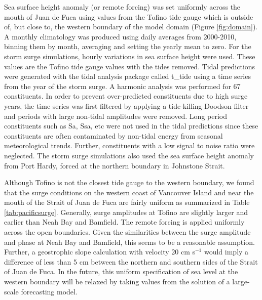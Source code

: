 \documentclass[letterpaper]{tATO2e}
\begin{document}
Sea surface height anomaly (or remote forcing) was set uniformly across the mouth of Juan de Fuca using values from the Tofino tide gauge \citep{DFOObservations} which is outside of, but close to, the western boundary of the model domain (Figure \ref{fig:domain}).  A monthly climatology was produced using daily averages from 2000-2010, binning them by month, averaging and setting the yearly mean to zero.  For the storm surge simulations, hourly variations in sea surface height were used.  These values are the Tofino tide gauge values with the tides removed. {\color{red}Tidal predictions were generated with the tidal analysis package called t\_tide \citep{pawlowicz2002classical} using a time series from the year of the storm surge. A harmonic analysis was performed for 67 constituents. In order to prevent over-predicted constituents due to high surge years, the time series was first filtered by applying a tide-killing Doodson filter \citep{parker2007NOAA} and periods with large non-tidal amplitudes were removed. Long period constituents such as Sa, Ssa, etc were not used in the tidal predictions since these constituents are often contaminated by non-tidal energy from seasonal meteorological trends. Further, constituents with a low signal to noise ratio were neglected. } The storm surge simulations also used the sea surface height anomaly from Port Hardy, forced at the northern boundary in Johnstone Strait. 

{\color{red} Although Tofino is not the closest tide gauge to the western boundary, we found that the surge conditions on the western coast of Vancouver Island and near the mouth of the Strait of Juan de Fuca are fairly uniform as summarized in Table \ref{tab:pacificsurge}. Generally, surge amplitudes at Tofino are slightly larger and earlier than Neah Bay and Bamfield. The remote forcing is applied uniformly across the open boundaries. Given the similarities between the surge amplitude and phase at Neah Bay and Bamfield, this seems to be a reasonable assumption. Further, a geostrophic slope calculation with velocity 20 cm s$^{-1}$ would imply a difference of less than 5 cm between the northern and southern sides of the Strait of Juan de Fuca. In the future, this uniform specification of sea level at the western boundary will be relaxed by taking values from the solution of a large-scale forecasting model.} 
\end{document}
